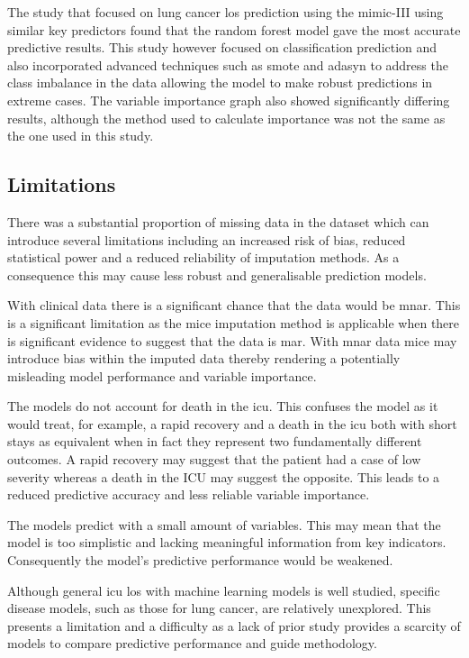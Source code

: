 \documentclass[11pt]{article}
\begin{document}
The study that focused on lung cancer \gls{los} prediction using the \gls{mimic}-III using similar key predictors\cite{Alsinglawi123} found that the random forest model gave the most accurate predictive results. This study however focused on classification prediction and also incorporated advanced techniques such as \gls{smote}\cite{Chawla2002} and \gls{adasyn}\cite{Susan2020} to address the class imbalance in the data allowing the model to make robust predictions in extreme cases. The variable importance graph also showed significantly differing results, although the method used to calculate importance was not the same as the one used in this study.

\subsection{Limitations}

There was a substantial proportion of missing data in the dataset which can introduce several limitations including an increased risk of bias, reduced statistical power and a reduced reliability of imputation methods. As a consequence this may cause less robust and generalisable prediction models.

With clinical data there is a significant chance that the data would be \gls{mnar}. This is a significant limitation as the \gls{mice} imputation method is applicable when there is significant evidence to suggest that the data is \gls{mar}. With \gls{mnar} data \gls{mice} may introduce bias within the imputed data thereby rendering a potentially misleading model performance and variable importance.

The models do not account for death in the \gls{icu}. This confuses the model as it would treat, for example, a rapid recovery and a death in the \gls{icu} both with short stays as equivalent when in fact they represent two fundamentally different outcomes. A rapid recovery may suggest that the patient had a case of low severity whereas a death in the ICU may suggest the opposite. This leads to a reduced predictive accuracy and less reliable variable importance.

The models predict with a small amount of variables. This may mean that the model is too simplistic and lacking meaningful information from key indicators. Consequently the model's predictive performance would be weakened.

Although general \gls{icu} \gls{los} with machine learning models is well studied, specific disease models, such as those for lung cancer, are relatively unexplored. This presents a limitation and a difficulty as a lack of prior study provides a scarcity of models to compare predictive performance and guide methodology.
\end{document}
